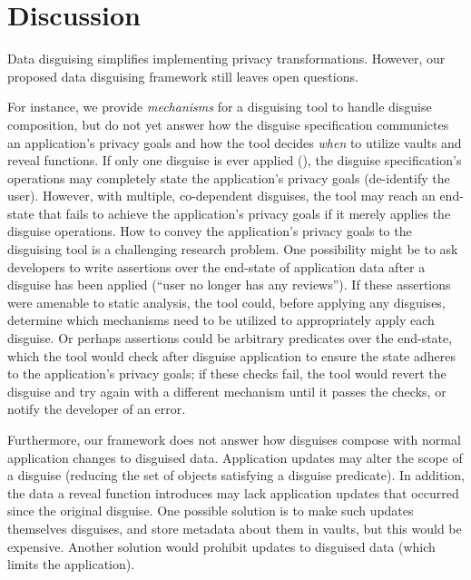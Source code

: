 \section{Discussion}
\label{s:disc}
%
Data disguising simplifies implementing privacy transformations.
%
However, our proposed data disguising framework still leaves open questions.
%

%
For instance, we provide \emph{mechanisms} for a disguising tool
to handle disguise composition, but do not yet answer how the disguise specification
communictes an application's privacy goals and how the tool decides \emph{when} to
utilize vaults and reveal functions.
%
%
If only one disguise is ever applied (\eg \gdpr), the disguise specification's operations
may completely state the application's privacy goals (\eg de-identify the user).
%
However, with multiple, co-dependent disguises, the tool may reach an end-state that
fails to achieve the application's privacy goals if it merely applies the disguise
operations.
%
How to convey the application's privacy goals to the disguising tool is a challenging
research problem.
%
One possibility might be to ask developers to write assertions over the end-state of
application data after a disguise has been applied (\eg ``user no longer has any reviews'').
%
If these assertions were amenable to static analysis, the tool could, before applying any
disguises, determine which mechanisms need to be utilized to appropriately apply each
disguise.
%
Or perhaps assertions could be arbitrary predicates over the end-state, which the
tool would check after disguise application to ensure the state adheres to the
application's privacy goals; if these checks fail, the tool would revert the disguise
and try again with a different mechanism until it passes the checks, or notify the developer
of an error.
%

%
Furthermore, our framework does not answer how disguises compose with normal application
changes to disguised data.
%
Application updates may alter the scope of a disguise (\ie reducing the set of
objects satisfying a disguise predicate).
%
In addition, the data a reveal function introduces may lack application updates that
occurred since the original disguise.
%
One possible solution is to make such updates themselves disguises, and store metadata
about them in vaults, but this would be expensive.
%
Another solution would prohibit updates to disguised data (which limits the application).
%

